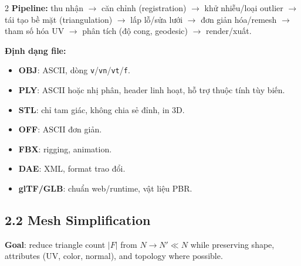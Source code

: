 \begin{paracol}{2}
\textbf{Pipeline:} thu nhận $\to$ căn chỉnh (registration) $\to$ khử nhiễu/loại outlier $\to$ tái tạo bề mặt (triangulation) $\to$ lấp lỗ/sửa lưới $\to$ đơn giản hóa/remesh $\to$ tham số hóa UV $\to$ phân tích (độ cong, geodesic) $\to$ render/xuất.

\textbf{Định dạng file:}
\begin{itemize}[leftmargin=*,nosep]
  \item \textbf{OBJ}: ASCII, dòng \texttt{v}/\texttt{vn}/\texttt{vt}/\texttt{f}.
  \item \textbf{PLY}: ASCII hoặc nhị phân, header linh hoạt, hỗ trợ thuộc tính tùy biến.
  \item \textbf{STL}: chỉ tam giác, không chia sẻ đỉnh, in 3D.
  \item \textbf{OFF}: ASCII đơn giản.
  \item \textbf{FBX}: rigging, animation.
  \item \textbf{DAE}: XML, format trao đổi.
  \item \textbf{glTF/GLB}: chuẩn web/runtime, vật liệu PBR.
\end{itemize}

\switchcolumn*

\subsection*{2.2 Mesh Simplification}
\textbf{Goal}: reduce triangle count $|F|$ from $N\to N'\!\ll\!N$ while preserving shape, attributes (UV, color, normal), and topology where possible.


\end{paracol}
